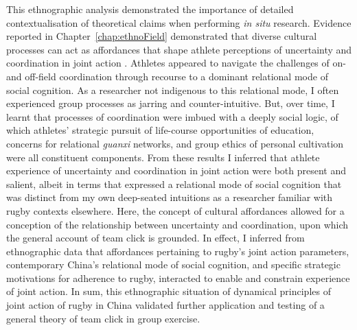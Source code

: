 This ethnographic analysis demonstrated the importance of detailed contextualisation of theoretical claims when performing \textit{in situ} research.  Evidence reported in Chapter~\ref{chap:ethnoField} demonstrated that diverse cultural processes can act as affordances that shape athlete perceptions of uncertainty and coordination in joint action \citep{Ramstead2016}.  Athletes appeared to navigate the challenges of on- and off-field coordination through recourse to a dominant relational mode of social cognition.  As a researcher not indigenous to this relational mode, I often experienced group processes as jarring and counter-intuitive.  But, over time, I learnt that processes of coordination were imbued with a deeply social logic, of which athletes' strategic pursuit of life-course opportunities of education, concerns for relational \textit{guanxi} networks, and group ethics of personal cultivation were all constituent components.  From these results I inferred that athlete experience of uncertainty and coordination in joint action were both present and salient, albeit in terms that expressed a relational mode of social cognition that was distinct from my own deep-seated intuitions as a researcher familiar with rugby contexts elsewhere. Here, the concept of cultural affordances \citep{Ramstead2016} allowed for a conception of the relationship between uncertainty and coordination, upon which the general account of team click is grounded.  In effect, I inferred from ethnographic data that affordances pertaining to rugby's joint action parameters, contemporary China's relational mode of social cognition, and specific strategic motivations for adherence to rugby, interacted to enable and constrain experience of joint action. In sum, this ethnographic situation of dynamical principles of joint action of rugby in China validated further application and testing of a general theory of team click in group exercise.


